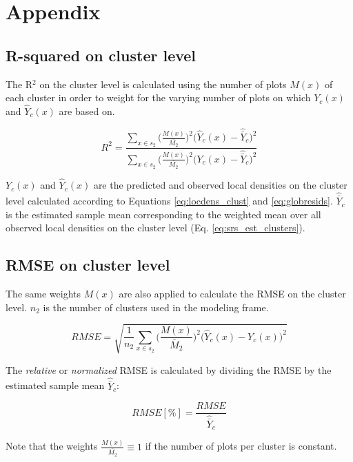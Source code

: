 \appendix
\section{Appendix}
\label{sec:appendix_saerlp}

\subsection*{R-squared on cluster level}

The R$^2$ on the cluster level is calculated using the number of plots $M(x)$ of each cluster in order to weight for the varying number of plots on which $Y_c(x)$ and $\hat{Y}_{c}(x)$ are based on. 

\begin{equation*}\label{eq:R_squared_clust}
R^2 =  \frac{\sum_{x \in s_2} \Big(\frac{M(x)}{\bar{M_2}}\Big)^2 \Big(\hat{Y}_{c}(x)-\hat{\bar{Y}}_c\Big)^2}{\sum_{x \in s_2} \Big(\frac{M(x)}{\bar{M_2}}\Big)^2 \Big(Y_{c}(x)-\hat{\bar{Y}}_c\Big)^2}
\end{equation*}

\noindent $Y_c(x)$ and $\hat{Y}_{c}(x)$ are the predicted and observed local densities on the cluster level calculated according to Equations \ref{eq:locdens_clust} and \ref{eq:globresids}. $\hat{\bar{Y}}_c$ is the estimated sample mean corresponding to the weighted mean over all observed local densities on the cluster level (Eq. \ref{eq:srs_est_clusters}).\par

\subsection*{RMSE on cluster level}

The same weights $M(x)$ are also applied to calculate the RMSE on the cluster level. $n_2$ is the number of clusters used in the modeling frame.

\begin{equation*}\label{eq:RMSE_clust}
RMSE= \sqrt{\frac{1}{n_{2}}  \sum_{x \in s_2} \Big(\frac{M(x)}{\bar{M}_2}\Big)^2 \Big(\hat{Y}_{c}(x)-Y_c(x)\Big)^2}
\end{equation*}

\noindent The \textit{relative} or \textit{normalized} RMSE is calculated by dividing the RMSE by the estimated sample mean $\hat{\bar{Y}}_c$:

\begin{equation*}\label{eq:NRMSE_clust}
RMSE[\%] = \frac{RMSE}{\hat{\bar{Y}}_c}
\end{equation*}

\noindent Note that the weights $\frac{M(x)}{\bar{M_2}} \equiv 1$ if the number of plots per cluster is constant.
